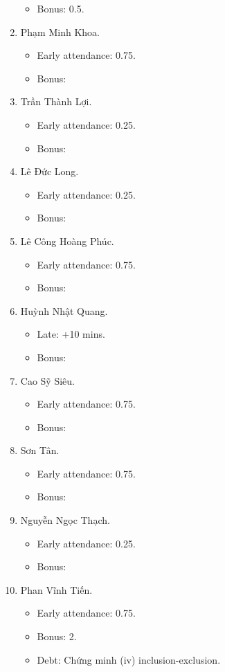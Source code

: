 \documentclass{article}
\begin{document}
\begin{enumerate}
	\begin{itemize}
		\item Bonus: 0.5.
	\end{itemize}
	\item {\sc Phạm Minh Khoa.}
	\begin{itemize}
		\item Early attendance: 0.75.
		\item Bonus:
	\end{itemize}
	\item {\sc Trần Thành Lợi.}
	\begin{itemize}
		\item Early attendance: 0.25.
		\item Bonus: 
	\end{itemize}
	\item {\sc Lê Đức Long.}
	\begin{itemize}
		\item Early attendance: 0.25.
		\item Bonus: 
	\end{itemize}
	\item {\sc Lê Công Hoàng Phúc.}
	\begin{itemize}
		\item Early attendance: 0.75.
		\item Bonus: 
	\end{itemize}
	\item {\sc Huỳnh Nhật Quang.}
	\begin{itemize}
		\item Late: +10 mins.
		\item Bonus: 
	\end{itemize}
	\item {\sc Cao Sỹ Siêu.}
	\begin{itemize}
		\item Early attendance: 0.75.
		\item Bonus: 
	\end{itemize}
	\item {\sc Sơn Tân.}
	\begin{itemize}
		\item Early attendance: 0.75.
		\item Bonus: 
	\end{itemize}
	\item {\sc Nguyễn Ngọc Thạch.}
	\begin{itemize}
		\item Early attendance: 0.25.
		\item Bonus: 
	\end{itemize}
	\item {\sc Phan Vĩnh Tiến.}
	\begin{itemize}
		\item Early attendance: 0.75.
		\item Bonus: 2.
		\item Debt: Chứng minh (iv) inclusion-exclusion.
	\end{itemize}
\end{enumerate}
\end{document}
